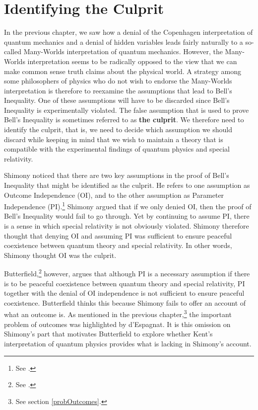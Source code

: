\section{Identifying the Culprit}
In the previous chapter, we saw how a denial of the Copenhagen interpretation of quantum mechanics and a denial of hidden variables leads fairly naturally to a so-called Many-Worlds interpretation of quantum mechanics. However, the Many-Worlds interpretation seems to be radically opposed to the view that we can make common sense truth claims about the physical world. A strategy among some philosophers of physics who do not wish to endorse the Many-Worlds interpretation is therefore to reexamine the assumptions that lead to Bell's Inequality. One of these assumptions will have to be discarded since Bell's Inequality is experimentally violated. The false assumption that is used to prove Bell's Inequality is sometimes referred to as \textbf{the culprit}. We therefore need to identify the culprit, that is, we need to decide which assumption we should discard while keeping in mind that we wish to maintain a theory that is compatible with the experimental findings of quantum physics and special relativity.

Shimony noticed that there are two key assumptions in the proof of Bell's Inequality that might be identified as the culprit. He refers to one assumption as {Outcome Independence} (OI), and to the other assumption as {Parameter Independence} (PI).\footnote{See \cite[146-147]{Shimony86}.} Shimony argued that if we only denied OI, then the proof of Bell's Inequality would fail to go through. Yet by continuing to assume PI, there is a sense in which special relativity is not obviously violated. Shimony therefore thought that denying OI and assuming PI was sufficient to ensure peaceful coexistence between quantum theory and special relativity. In other words, Shimony thought OI was the culprit. 

Butterfield,\footnote{See \cite{Butterfield}.} however, argues that although PI is a necessary assumption if there is to be peaceful coexistence between quantum theory and special relativity, PI together with the denial of OI independence is not sufficient to ensure peaceful coexistence. Butterfield thinks this because Shimony fails to offer an account of what an outcome is. As mentioned in the previous chapter,\footnote{See section \ref{probOutcomes}.} the important problem of outcomes was highlighted by d'Espagnat.
It is this omission on Shimony's part that motivates Butterfield to explore whether Kent's interpretation of quantum physics provides what is lacking in Shimony's account. 

